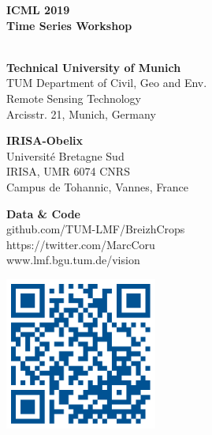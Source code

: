 \documentclass[a0]{tumposter}
\begin{document}
\begin{footer}
	\begin{minipage}{.17\textwidth}
		\textbf{ICML 2019 \\ Time Series Workshop}\\
		\phantom{A} \\ \phantom{B}
	\end{minipage}
	\begin{minipage}{.25\textwidth}
		\textbf{Technical University of Munich}\footnotemark[1]\\
		TUM Department of Civil, Geo and Env. \\
		Remote Sensing Technology \\
		Arcisstr. 21, Munich, Germany
	\end{minipage}
	\begin{minipage}{.25\textwidth}
		\textbf{IRISA-Obelix}\footnotemark[2]\\
		Université Bretagne Sud \\
		IRISA, UMR 6074 CNRS \\
		Campus de Tohannic, Vannes, France
		
	\end{minipage}
	\begin{minipage}{.25\textwidth}
		\textbf{Data \& Code} \\
		{github.com/TUM-LMF/BreizhCrops} \\
		{https://twitter.com/MarcCoru} \\
		www.lmf.bgu.tum.de/vision
	\end{minipage}
	\begin{minipage}{.05\textwidth}
		\hfill\includegraphics[width=5cm]{images/qrcode}
	\end{minipage}

\end{footer}
\end{document}
